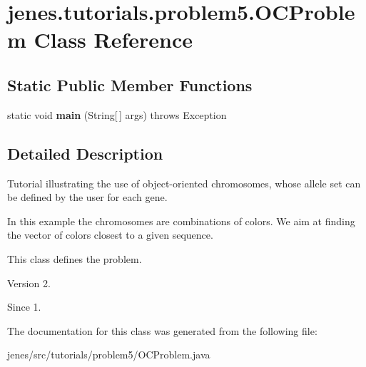 \hypertarget{classjenes_1_1tutorials_1_1problem5_1_1_o_c_problem}{\section{jenes.\-tutorials.\-problem5.\-O\-C\-Problem Class Reference}
\label{classjenes_1_1tutorials_1_1problem5_1_1_o_c_problem}
}
\subsection*{Static Public Member Functions}
\begin{DoxyCompactItemize}
\item 
\hypertarget{classjenes_1_1tutorials_1_1problem5_1_1_o_c_problem_aecd726bedeefdb1bfce0b0d453bef17e}{static void {\bfseries main} (String\mbox{[}$\,$\mbox{]} args)  throws Exception }\label{classjenes_1_1tutorials_1_1problem5_1_1_o_c_problem_aecd726bedeefdb1bfce0b0d453bef17e}

\end{DoxyCompactItemize}


\subsection{Detailed Description}
Tutorial illustrating the use of object-\/oriented chromosomes, whose allele set can be defined by the user for each gene.

In this example the chromosomes are combinations of colors. We aim at finding the vector of colors closest to a given sequence.

This class defines the problem.

\begin{DoxyVersion}{Version}
2. 
\end{DoxyVersion}
\begin{DoxySince}{Since}
1. 
\end{DoxySince}


The documentation for this class was generated from the following file\-:\begin{DoxyCompactItemize}
\item 
jenes/src/tutorials/problem5/O\-C\-Problem.\-java\end{DoxyCompactItemize}

